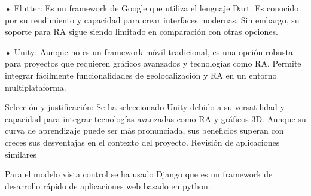 	•	Flutter: Es un framework de Google que utiliza el lenguaje Dart. Es conocido por su rendimiento y capacidad para crear interfaces modernas. Sin embargo, su soporte para RA sigue siendo limitado en comparación con otras opciones.
    
	•	Unity: Aunque no es un framework móvil tradicional, es una opción robusta para proyectos que requieren gráficos avanzados y tecnologías como RA. Permite integrar fácilmente funcionalidades de geolocalización y RA en un entorno multiplataforma.
    
Selección y justificación: Se ha seleccionado Unity debido a su versatilidad y capacidad para integrar tecnologías avanzadas como RA y gráficos 3D. Aunque su curva de aprendizaje puede ser más pronunciada, sus beneficios superan con creces sus desventajas en el contexto del proyecto.
Revisión de aplicaciones similares

Para el modelo vista control se ha usado Django que es un framework de desarrollo rápido de aplicaciones web basado en python. 